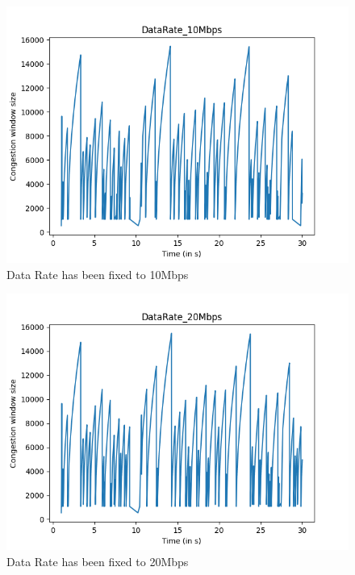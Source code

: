 \documentclass{article}
\begin{document}
\begin{figure}[H]
    \centering
    \includegraphics[scale = 0.8]{Q2/outputs/plots/DataRate_10Mbps.png}
    \caption{Data Rate has been fixed to 10Mbps}
\end{figure}

\begin{figure}[H]
    \centering
    \includegraphics[scale = 0.8]{Q2/outputs/plots/DataRate_20Mbps.png}
    \caption{Data Rate has been fixed to 20Mbps}
\end{figure}
\end{document}
